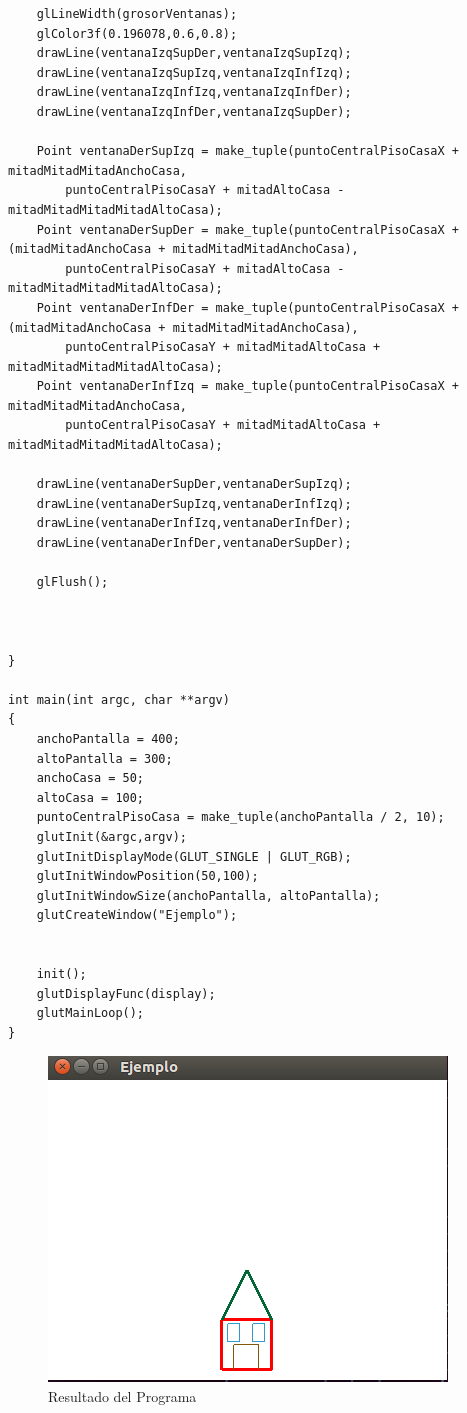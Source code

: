 \documentclass[a4paper,12pt]{article}
\begin{document}
\begin{enumerate}
\begin{lstlisting}
    glLineWidth(grosorVentanas);
    glColor3f(0.196078,0.6,0.8);
    drawLine(ventanaIzqSupDer,ventanaIzqSupIzq);
    drawLine(ventanaIzqSupIzq,ventanaIzqInfIzq);
    drawLine(ventanaIzqInfIzq,ventanaIzqInfDer);
    drawLine(ventanaIzqInfDer,ventanaIzqSupDer);

    Point ventanaDerSupIzq = make_tuple(puntoCentralPisoCasaX + mitadMitadMitadAnchoCasa,
        puntoCentralPisoCasaY + mitadAltoCasa - mitadMitadMitadMitadAltoCasa);
    Point ventanaDerSupDer = make_tuple(puntoCentralPisoCasaX + (mitadMitadAnchoCasa + mitadMitadMitadAnchoCasa),
        puntoCentralPisoCasaY + mitadAltoCasa - mitadMitadMitadMitadAltoCasa);
    Point ventanaDerInfDer = make_tuple(puntoCentralPisoCasaX + (mitadMitadAnchoCasa + mitadMitadMitadAnchoCasa),
        puntoCentralPisoCasaY + mitadMitadAltoCasa + mitadMitadMitadMitadAltoCasa);
    Point ventanaDerInfIzq = make_tuple(puntoCentralPisoCasaX + mitadMitadMitadAnchoCasa,
        puntoCentralPisoCasaY + mitadMitadAltoCasa + mitadMitadMitadMitadAltoCasa);

    drawLine(ventanaDerSupDer,ventanaDerSupIzq);
    drawLine(ventanaDerSupIzq,ventanaDerInfIzq);
    drawLine(ventanaDerInfIzq,ventanaDerInfDer);
    drawLine(ventanaDerInfDer,ventanaDerSupDer);
    
    glFlush();

    
    
}

int main(int argc, char **argv)
{
    anchoPantalla = 400;
    altoPantalla = 300;
    anchoCasa = 50;
    altoCasa = 100;
    puntoCentralPisoCasa = make_tuple(anchoPantalla / 2, 10);   
    glutInit(&argc,argv);
    glutInitDisplayMode(GLUT_SINGLE | GLUT_RGB);
    glutInitWindowPosition(50,100);
    glutInitWindowSize(anchoPantalla, altoPantalla);
    glutCreateWindow("Ejemplo");


    init();
    glutDisplayFunc(display);
    glutMainLoop();
}
 \end{lstlisting}

 \begin{figure}[H]
  \centering
  \includegraphics[scale = 0.5]{4.png}
  \caption{Resultado del Programa}
 \end{figure}
 

\end{enumerate}
\end{document}
